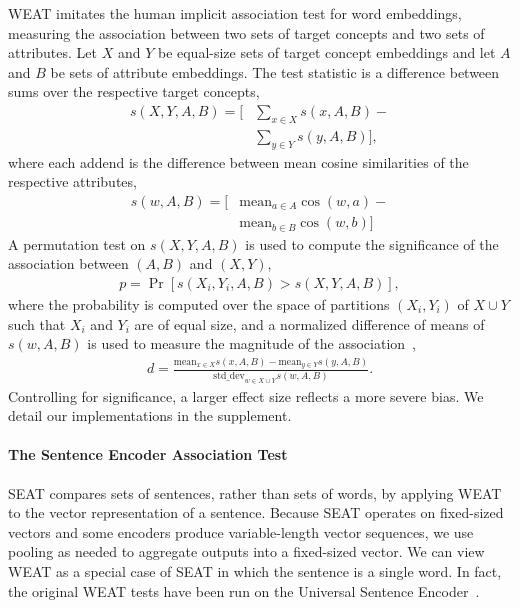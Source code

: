 \documentclass[11pt,a4paper]{article}
\newcommand{\mean}{\ensuremath{\mathrm{mean}}}
\newcommand{\stddev}{\ensuremath{\mathrm{std\_dev}}}
\begin{document}
WEAT imitates the human implicit association test \citep{greenwald1998measuring} for word embeddings, measuring the association between two sets of target concepts and two sets of attributes.  Let $X$ and $Y$ be equal-size sets of target concept embeddings and let $A$ and $B$ be sets of attribute embeddings.  The test statistic is a difference between sums over the respective target concepts,
\begin{align*}
    s(X, Y, A, B) = \big[ &\textstyle{\sum}_{x \in X} s(x, A, B) - \\
    &\textstyle{\sum}_{y \in Y} s(y, A, B) \big],
\end{align*}
where each addend is the difference between mean cosine similarities of the respective attributes,
\begin{align*}
    s(w, A, B) = \big[ &\mathrm{mean}_{a \in A} \cos(w, a) - \\
    &\mathrm{mean}_{b \in B} \cos(w, b) \big]
\end{align*}
A permutation test on $s(X, Y, A, B)$ is used to compute the significance of the association between $(A, B)$ and $(X, Y)$,
\begin{align*}
    p = \Pr \left[s(X_i, Y_i, A, B) > s(X, Y, A, B)\right],
\end{align*}
where the probability is computed over the space of partitions $(X_i, Y_i)$ of $X \cup Y$ such that $X_i$ and $Y_i$ are of equal size, and
a normalized difference of means of $s(w, A, B)$ is used to measure the magnitude of the association~\citep[the effect size; ][]{caliskan2017semantics},
\begin{align*}
    d = \frac{
        \mean_{x \in X} s(x, A, B) - \mean_{y \in Y} s(y, A, B)
    }{
        \stddev_{w \in X \cup Y} s(w, A, B)
    }.
\end{align*}
Controlling for significance, a larger effect size reflects a more severe bias.
We detail our implementations in the supplement.

\paragraph{The Sentence Encoder Association Test}

SEAT compares sets of sentences, rather than sets of words, by applying WEAT to the vector representation of a sentence.
Because SEAT operates on fixed-sized vectors and some encoders produce variable-length vector sequences, we use pooling as needed to aggregate outputs into a fixed-sized vector.
We can view WEAT as a special case of SEAT in which the sentence is a single word.  
In fact, the original WEAT tests have been run on the Universal Sentence Encoder~\cite{cer2018universal}.
\end{document}
